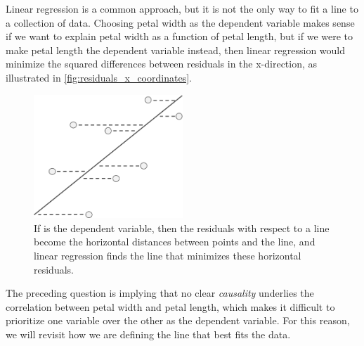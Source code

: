 Linear regression is a common approach, but it is not the only way to fit a line to a collection of data. Choosing petal width as the dependent variable makes sense if we want to explain petal width as a function of petal length, but if we were to make petal length the dependent variable instead, then linear regression would minimize the squared differences between residuals in the x-direction, as illustrated in \autoref{fig:residuals_x_coordinates}.\\

\begin{figure}[h]
\centering
\mySfFamily
\includegraphics[width = 0.5\textwidth]{../images/residuals_x_coordinates.png}
\caption{If  is the dependent variable, then the residuals with respect to a line become the horizontal distances between points and the line, and linear regression finds the line that minimizes these horizontal residuals.}
\label{fig:residuals_x_coordinates}
\end{figure}

\begin{note}\end{note}

\begin{qbox}\end{qbox}

The preceding question is implying that no clear \textit{causality} underlies the correlation between petal width and petal length, which makes it difficult to prioritize one variable over the other as the dependent variable. For this reason, we will revisit how we are defining the line that best fits the data.

